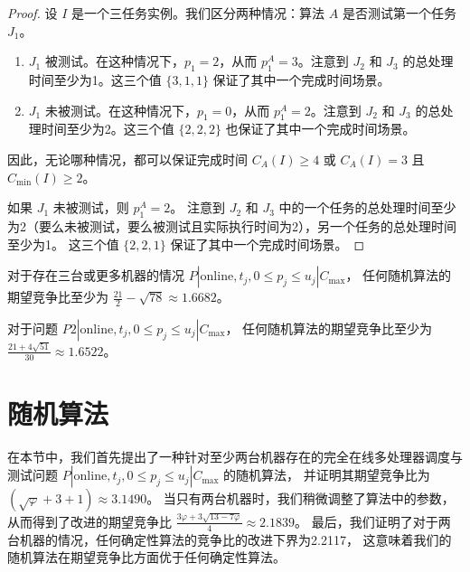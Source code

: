\begin{proof}
    设 \( I \) 是一个三任务实例。我们区分两种情况：算法 \( A \) 是否测试第一个任务 \( J_1 \)。
    \begin{enumerate}
        \item \( J_1 \) 被测试。在这种情况下，\( p_1 = 2 \)，从而 \( p^A_1 = 3 \)。注意到 \( J_2 \) 和 \( J_3 \) 的总处理时间至少为1。这三个值 \(\{3, 1, 1\}\) 保证了其中一个完成时间场景。
        \item \( J_1 \) 未被测试。在这种情况下，\( p_1 = 0 \)，从而 \( p^A_1 = 2 \)。注意到 \( J_2 \) 和 \( J_3 \) 的总处理时间至少为2。这三个值 \(\{2, 2, 2\}\) 也保证了其中一个完成时间场景。
    \end{enumerate}
    因此，无论哪种情况，都可以保证完成时间 \( C_A(I) \geq 4 \) 或 \( C_A(I) = 3 \) 且 \( C_{\min}(I) \geq 2 \)。

    如果 \( J_1 \) 未被测试，则 \( p^A_1 = 2 \)。
    注意到 \( J_2 \) 和 \( J_3 \) 中的一个任务的总处理时间至少为2（要么未被测试，要么被测试且实际执行时间为2），另一个任务的总处理时间至少为1。
    这三个值 \(\{2, 2, 1\}\) 保证了其中一个完成时间场景。
\end{proof}

\begin{thm}
    对于存在三台或更多机器的情况 \( P | \text{online}, t_j, 0 \leq p_j \leq u_j | C_{\max} \)，
    任何随机算法的期望竞争比至少为 \( \frac{21}{2} - \sqrt{78} \approx 1.6682 \)。

\end{thm}

\begin{thm}
    对于问题 \( P2 | \text{online}, t_j, 0 \leq p_j \leq u_j | C_{\max} \)，
    任何随机算法的期望竞争比至少为 \( \frac{21 + 4\sqrt{51}}{30} \approx 1.6522 \)。
\end{thm}

\section{随机算法}

在本节中，我们首先提出了一种针对至少两台机器存在的完全在线多处理器调度与测试问题 
\( P | \text{online}, t_j, 0 \leq p_j \leq u_j | C_{\max} \) 的随机算法，
并证明其期望竞争比为 \( (\sqrt{\varphi} + 3 + 1) \approx 3.1490 \)。
当只有两台机器时，我们稍微调整了算法中的参数，
从而得到了改进的期望竞争比 \( \frac{3\varphi + 3\sqrt{13 - 7\varphi}}{4} \approx 2.1839 \)。
最后，我们证明了对于两台机器的情况，任何确定性算法的竞争比的改进下界为2.2117，
这意味着我们的随机算法在期望竞争比方面优于任何确定性算法。


